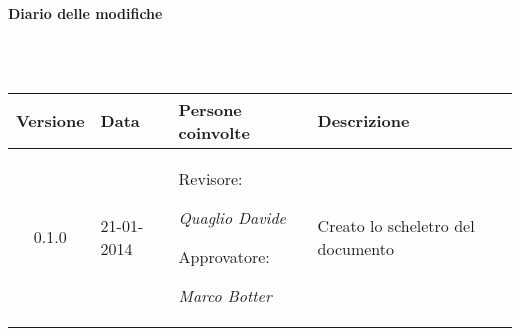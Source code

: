 \noindent\begin{Large}\textbf{Diario delle modifiche}\end{Large}\\
\\
\begin{small}
\begin{tabular}{|c|p{1.7cm}|p{2.8cm}|p{7cm}|}
\hline
Versione & Data & Persone coinvolte & Descrizione \\
\hline
\hline
0.1.0 & 21-01-2014 & Revisore: 

\textit{Quaglio Davide}

Approvatore: 

\textit{Marco Botter} &  Creato lo scheletro del documento\\
\hline
\end{tabular}\\
\end{small}